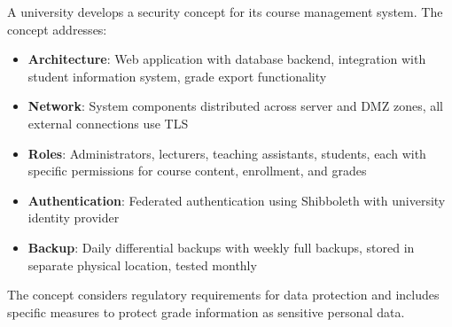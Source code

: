 \begin{example}
A university develops a security concept for its course management system. The concept addresses:

\begin{itemize}
    \item \textbf{Architecture}: Web application with database backend, integration with student information system, grade export functionality
    \item \textbf{Network}: System components distributed across server and DMZ zones, all external connections use TLS
    \item \textbf{Roles}: Administrators, lecturers, teaching assistants, students, each with specific permissions for course content, enrollment, and grades
    \item \textbf{Authentication}: Federated authentication using Shibboleth with university identity provider
    \item \textbf{Backup}: Daily differential backups with weekly full backups, stored in separate physical location, tested monthly
\end{itemize}

The concept considers regulatory requirements for data protection and includes specific measures to protect grade information as sensitive personal data.
\end{example}

